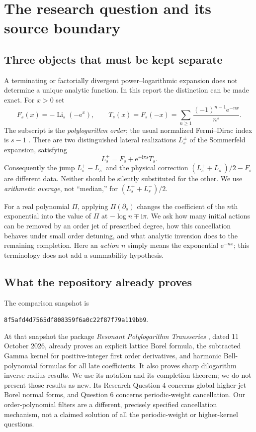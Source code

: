 \documentclass[11pt,a4paper]{article}
\numberwithin{equation}{section}
\theoremstyle{definition}\newtheorem{definition}[theorem]{Definition}
\theoremstyle{remark}\newtheorem{remark}[theorem]{Remark}
\newcommand{\ee}{\mathrm e}\newcommand{\ii}{\mathrm i}\newcommand{\dd}{\,\mathrm d}
\newcommand{\Li}{\operatorname{Li}}\newcommand{\PV}{\operatorname{PV}}
\newcommand{\snap}{\texttt{8f5afd4d7565df808359f6a0c22f87f79a119bb9}}
\begin{document}
\section{The research question and its source boundary}
\label{ojf:sec:context}

\subsection{Three objects that must be kept separate}
A terminating or factorially divergent power--logarithmic expansion does
not determine a unique analytic function. In this report the distinction
can be made exact. For $x>0$ set
\begin{equation}\label{ojf:eq:defs}
 F_s(x)=-\Li_s(-\ee^x),\qquad
 T_s(x)=F_s(-x)=\sum_{n\ge1}\frac{(-1)^{n-1}\ee^{-nx}}{n^s}.
\end{equation}
The subscript is the \emph{polylogarithm order}; the usual normalized
Fermi--Dirac index is $s-1$ \cite{DLMFpoly}.
There are two distinguished lateral realizations $L_s^\pm$ of the
Sommerfeld expansion, satisfying
\begin{equation}\label{ojf:eq:intro-completion}
 L_s^\pm=F_s+\ee^{\mp\ii\pi s}T_s.
\end{equation}
Consequently the jump $L_s^+-L_s^-$ and the physical correction
$(L_s^++L_s^-)/2-F_s$ are different data. Neither should be silently
substituted for the other. We use \emph{arithmetic average}, not
``median,'' for $(L_s^++L_s^-)/2$.

For a real polynomial $\Pi$, applying $\Pi(\partial_s)$ changes the
coefficient of the $n$th exponential into the value of $\Pi$ at
$-\log n\mp\ii\pi$. We ask how many initial actions can be removed by
an order jet of prescribed degree, how this cancellation behaves under
small order detuning, and what analytic inversion does to the remaining
completion. Here an \emph{action $n$} simply means the exponential
$\ee^{-nx}$; this terminology does not add a summability hypothesis.

\subsection{What the repository already proves}
The comparison snapshot is
\begin{center}\small\snap.\end{center}
At that snapshot the package \emph{Resonant Polylogarithm Transseries}
\cite{RepoResonant}, dated 11 October 2026, already proves an explicit
lattice Borel formula, the subtracted Gamma kernel for positive-integer
first order derivatives, and harmonic Bell-polynomial formulas for
all late coefficients. It also proves sharp dilogarithm inverse-radius
results. We use its notation and its completion theorem; we do not
present those results as new. Its Research Question 4 concerns global
higher-jet Borel normal forms, and Question 6 concerns periodic-weight
cancellation. Our order-polynomial filters are a different, precisely
specified cancellation mechanism, not a claimed solution of all the
periodic-weight or higher-kernel questions.
\end{document}
